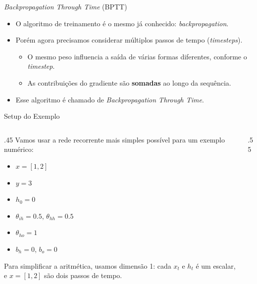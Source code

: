 \documentclass[aspectratio=169,xcolor=dvipsnames]{beamer}
\newcommand{\rnncellgraph}[8]{%
    \node[draw, circle, inner sep=1pt, fill=white] (plus#1) at (#2, 0) {$+$};
    \node[opnode, minimum width=1.45cm, left=0.3cm of plus#1] (hh#1) {#4};
    \node[opnode, minimum width=1.45cm, right=0.3cm of plus#1] (tanh#1) {$\tanh$};
    \node[opnode, below=0.4cm of plus#1] (xh#1) {#3};
    \node[opnode, fill=PastelPink, above=0.4cm of plus#1] (out#1) {#5};
    \begin{scope}[on background layer]
        \node[rnncell, fit=(hh#1)(tanh#1)(xh#1)(out#1), inner sep=0.25cm] (cell#1) {};
    \end{scope}
    \node[inputnode] (xnode#1) at ($(plus#1 |- cell#1.south) + (0, -0.85)$) {#6};
    \node[outputnode, minimum size=0.85cm] (ynode#1) at ($(plus#1 |- cell#1.north) + (0, 0.95)$) {#7};
    \ifx\relax#8\relax\else
        \node[font=\footnotesize, anchor=south west, inner sep=1pt] at (ynode#1.north east) {#8};
    \fi
    \draw[->] (xnode#1) -- (xh#1);
    \draw[->] (xh#1) -- (plus#1);
    \draw[->] (hh#1) -- (plus#1);
    \draw[->] (plus#1) -- (tanh#1);
    \draw[->] (tanh#1) |- (out#1);
    \draw[->] (out#1) -- (ynode#1);
}
\begin{document}
\begin{frame}{\textit{Backpropagation Through Time} (BPTT)}
\begin{itemize}
    \item O algoritmo de treinamento é o mesmo já conhecido: \textit{backpropagation}.
    \item Porém agora precisamos considerar múltiplos passos de tempo (\textit{timesteps}).
    \begin{itemize}
        \item O mesmo peso influencia a saída de várias formas diferentes, conforme o \textit{timestep}.
        \item As contribuições do gradiente são \textbf{somadas} ao longo da sequência.
    \end{itemize}
    \item Esse algoritmo é chamado de \textit{Backpropagation Through Time}.
\end{itemize}
\end{frame}

\begin{frame}{Setup do Exemplo}
\begin{columns}
    \begin{column}{.45\linewidth}
        Vamos usar a rede recorrente mais simples possível para um exemplo numérico:
        \begin{itemize}\small
            \item $x = [1, 2]$
            \item $y = 3$
            \item $h_0 = 0$
            \item $\theta_{ih} = 0.5$, \quad $\theta_{hh} = 0.5$
            \item $\theta_{ho} = 1$
            \item $b_h = 0$, \quad $b_o = 0$
        \end{itemize}
        \vspace{0.2em}
        {\footnotesize Para simplificar a aritmética, usamos dimensão 1: cada $x_t$ e $h_t$ é um escalar, e $x = [1, 2]$ são dois passos de tempo.}
    \end{column}
    \begin{column}{.55\linewidth}
        \centering
    \end{column}
\end{columns}
\end{frame}
\end{document}
